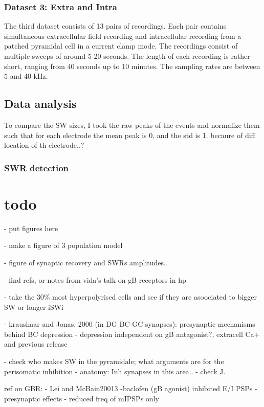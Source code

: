     \subsubsection{Dataset 3: Extra and Intra}
      The third dataset consists of 13 pairs of recordings.  Each pair contains
      simultaneous extracellular field recording and intracellular recording
      from a patched pyramidal cell in a current clamp mode.  The recordings
      consist of multiple sweeps of around 5-20 seconds.  The length of each
      recording is rather short, ranging from 40 seconds up to 10 minutes.  The
      sampling rates are between 5 and 40 kHz.

  \subsection{Data analysis}
      To compare the SW sizes, I took the raw peaks of
      the events and normalize them such that for each electrode the mean peak
      is 0, and the std is 1.  becaure of diff location of th electrode..?
      
    \subsubsection{SWR detection}
    
\section{todo}
  - put figures here

  - make a figure of 3 population model

  - figure of synaptic recovery and SWRs amplitudes..

  - find refs, or notes from vida's talk on gB receptors in hp

  - take the 30\% most hyperpolyrised cells and see if they are asoociated to bigger SW or longer iSWi

  - kraushaar and Jonas, 2000 (in DG BC-GC synapses): presynaptic mechanisms behind BC depression 
    - depression independent on gB antagonist?, extracell Ca+ and previous release

  - check who makes SW in the pyramidale; what arguments are for the perisomatic inhibition
      - anatomy: Inh synapses in this area..
      - check J.


  ref on GBR:
    - Lei and McBain20013
      -baclofen (gB agonist) inhibited E/I PSPs
      - presynaptic effects
      - reduced freq of mIPSPs only

